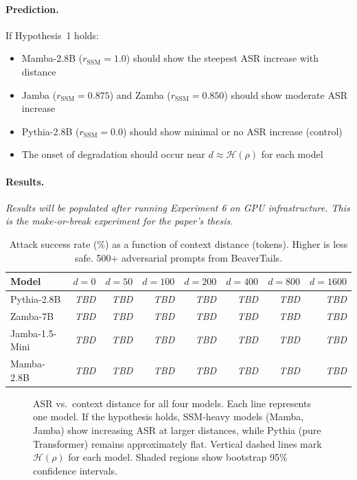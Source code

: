 \documentclass{article}
\newcommand{\rSSM}{r_{\mathrm{SSM}}}
\newcommand{\Horizon}{\mathcal{H}(\rho)}
\begin{document}
\paragraph{Prediction.}
If Hypothesis~1 holds:
\begin{itemize}[nosep]
  \item Mamba-2.8B ($\rSSM=1.0$) should show the steepest ASR increase with distance
  \item Jamba ($\rSSM=0.875$) and Zamba ($\rSSM=0.850$) should show moderate ASR increase
  \item Pythia-2.8B ($\rSSM=0.0$) should show minimal or no ASR increase (control)
  \item The onset of degradation should occur near $d \approx \Horizon$ for each model
\end{itemize}

\paragraph{Results.}
\emph{Results will be populated after running Experiment 6 on GPU infrastructure.
This is the make-or-break experiment for the paper's thesis.}

\begin{table}[ht]
  \centering
  \caption{Attack success rate (\%) as a function of context distance (tokens).
           Higher is less safe. 500+ adversarial prompts from BeaverTails.}
  \label{tab:distance-decay}
  \begin{tabular}{lrrrrrrr}
    \toprule
    \textbf{Model} & $d{=}0$ & $d{=}50$ & $d{=}100$ & $d{=}200$ &
      $d{=}400$ & $d{=}800$ & $d{=}1600$ \\
    \midrule
    Pythia-2.8B    & \emph{TBD} & \emph{TBD} & \emph{TBD} & \emph{TBD} &
      \emph{TBD} & \emph{TBD} & \emph{TBD} \\
    Zamba-7B       & \emph{TBD} & \emph{TBD} & \emph{TBD} & \emph{TBD} &
      \emph{TBD} & \emph{TBD} & \emph{TBD} \\
    Jamba-1.5-Mini & \emph{TBD} & \emph{TBD} & \emph{TBD} & \emph{TBD} &
      \emph{TBD} & \emph{TBD} & \emph{TBD} \\
    Mamba-2.8B     & \emph{TBD} & \emph{TBD} & \emph{TBD} & \emph{TBD} &
      \emph{TBD} & \emph{TBD} & \emph{TBD} \\
    \bottomrule
  \end{tabular}
\end{table}

\begin{figure}[ht]
  \centering
  \fbox{\rule{0pt}{4.5cm}\rule{0.55\textwidth}{0pt}}
  \caption{ASR vs.\ context distance for all four models. Each line represents one model.
           If the hypothesis holds, SSM-heavy models (Mamba, Jamba) show increasing ASR
           at larger distances, while Pythia (pure Transformer) remains approximately flat.
           Vertical dashed lines mark $\Horizon$ for each model. Shaded regions show
           bootstrap 95\% confidence intervals.}
  \label{fig:distance-decay}
\end{figure}
\end{document}
